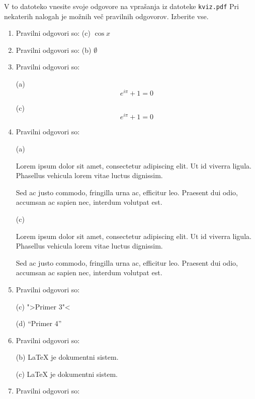 \documentclass[11pt]{article}
\begin{document}
V to datoteko vnesite svoje odgovore na vprašanja iz datoteke \texttt{kviz.pdf}
Pri nekaterih nalogah je možnih več pravilnih odgovorov. Izberite vse.

\begin{enumerate}
    \item Pravilni odgovori so: (c) \(\cos x\)
    
    \item Pravilni odgovori so: (b) \(\emptyset\)
    
    \item Pravilni odgovori so:
    
    (a)
      \[ e^{i \pi} + 1 = 0 \]

    (c)
      \begin{equation*}
          e^{i \pi} + 1 = 0
      \end{equation*}

    \item Pravilni odgovori so: %
          
(a)      

Lorem ipsum dolor sit amet, consectetur adipiscing 
elit. Ut id viverra ligula. Phasellus vehicula lorem 
vitae luctus dignissim. 
                
Sed ac justo commodo, fringilla urna ac, efficitur 
leo. Praesent dui odio, accumsan ac sapien nec, 
interdum volutpat est.
        
(c)


Lorem ipsum dolor sit amet, consectetur adipiscing 
elit. Ut id viverra ligula. Phasellus vehicula lorem 
vitae luctus dignissim. \par
Sed ac justo commodo, fringilla urna ac, efficitur 
leo. Praesent dui odio, accumsan ac sapien nec, 
interdum volutpat est.

    
      \item Pravilni odgovori so: %
        
        
          (c) \; ">Primer 3"<
        
          (d) \; "`Primer 4"'
      

    \item Pravilni odgovori so: %
    
        (b) \;
        {\LaTeX} je dokumentni sistem.

        (c) \;
        \LaTeX{} je dokumentni sistem.
    

    \item Pravilni odgovori so: %


\end{enumerate}
\end{document}
